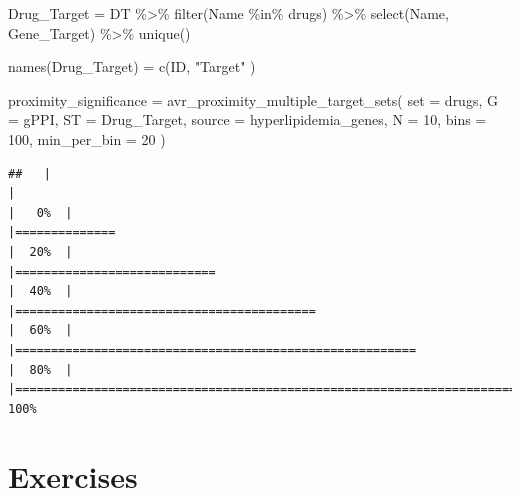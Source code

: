 \documentclass[
]{book}
\newenvironment{Shaded}{\begin{snugshade}}{\end{snugshade}}
\newcommand{\AttributeTok}[1]{\textcolor[rgb]{0.77,0.63,0.00}{#1}}
\newcommand{\DecValTok}[1]{\textcolor[rgb]{0.00,0.00,0.81}{#1}}
\newcommand{\FunctionTok}[1]{\textcolor[rgb]{0.00,0.00,0.00}{#1}}
\newcommand{\NormalTok}[1]{#1}
\newcommand{\OtherTok}[1]{\textcolor[rgb]{0.56,0.35,0.01}{#1}}
\newcommand{\SpecialCharTok}[1]{\textcolor[rgb]{0.00,0.00,0.00}{#1}}
\newcommand{\StringTok}[1]{\textcolor[rgb]{0.31,0.60,0.02}{#1}}
\begin{document}
\begin{Shaded}
\begin{Highlighting}[]
\NormalTok{Drug\_Target }\OtherTok{=}\NormalTok{ DT }\SpecialCharTok{\%\textgreater{}\%} 
  \FunctionTok{filter}\NormalTok{(Name }\SpecialCharTok{\%in\%}\NormalTok{ drugs) }\SpecialCharTok{\%\textgreater{}\%} 
  \FunctionTok{select}\NormalTok{(Name, Gene\_Target) }\SpecialCharTok{\%\textgreater{}\%} 
  \FunctionTok{unique}\NormalTok{()}

\FunctionTok{names}\NormalTok{(Drug\_Target) }\OtherTok{=} \FunctionTok{c}\NormalTok{(}\StringTok{\textquotesingle{}ID\textquotesingle{}}\NormalTok{, }\StringTok{"Target"}\NormalTok{ )}

\NormalTok{proximity\_significance }\OtherTok{=} \FunctionTok{avr\_proximity\_multiple\_target\_sets}\NormalTok{(}
  \AttributeTok{set =}\NormalTok{ drugs,}
  \AttributeTok{G =}\NormalTok{ gPPI,}
  \AttributeTok{ST =}\NormalTok{ Drug\_Target,}
  \AttributeTok{source =}\NormalTok{ hyperlipidemia\_genes,}
  \AttributeTok{N =} \DecValTok{10}\NormalTok{,}
  \AttributeTok{bins =} \DecValTok{100}\NormalTok{,}
  \AttributeTok{min\_per\_bin =} \DecValTok{20}
\NormalTok{)}
\end{Highlighting}
\end{Shaded}

\begin{verbatim}
##   |                                                                              |                                                                      |   0%  |                                                                              |==============                                                        |  20%  |                                                                              |============================                                          |  40%  |                                                                              |==========================================                            |  60%  |                                                                              |========================================================              |  80%  |                                                                              |======================================================================| 100%
\end{verbatim}

\hypertarget{exercises-1}{%
\section{Exercises}\label{exercises-1}}
\end{document}
